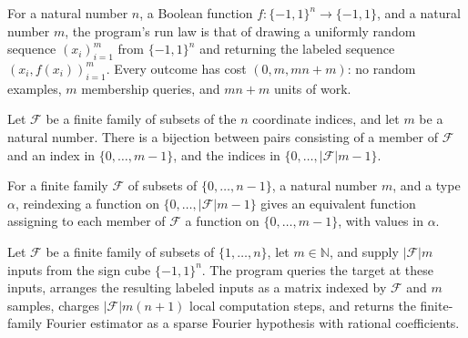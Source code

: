 \begin{theorem}
\label{FABL.runWithCost_queriedRandomExampleBatchProgram}
\leanok
{}
For a natural number $n$, a Boolean function $f:\{−1,1\}^n\to\{−1,1\}$, and a natural
number $m$, the program’s run law is that of drawing a uniformly random sequence
$(x_i)_{i=1}^m$ from $\{−1,1\}^n$ and returning the labeled sequence
$(x_i,f(x_i))_{i=1}^m$. Every outcome has cost $(0,m,mn+m)$: no random examples, $m$
membership queries, and $mn+m$ units of work.
\end{theorem}

\begin{definition}
\label{FABL.finiteFamilyMatrixIndexEquiv}
\leanok
Let $\mathcal F$ be a finite family of subsets of the $n$ coordinate indices, and let
$m$ be a natural number. There is a bijection between pairs consisting of a member of
$\mathcal F$ and an index in $\{0,\ldots,m-1\}$, and the indices in
$\{0,\ldots,|\mathcal F|m-1\}$.
\end{definition}

\begin{definition}
\label{FABL.finiteFamilyLinearToMatrixEquiv}
\leanok
{}
For a finite family $\mathcal F$ of subsets of $\{0,\ldots,n-1\}$, a natural number $m$,
and a type $\alpha$, reindexing a function on $\{0,\ldots,|\mathcal F|m-1\}$ gives an
equivalent function assigning to each member of $\mathcal F$ a function on
$\{0,\ldots,m-1\}$, with values in $\alpha$.
\end{definition}

\begin{definition}
\label{FABL.queriedFiniteFamilyFourierEstimatorFromInputs}
\leanok
{}
Let $\mathcal{F}$ be a finite family of subsets of $\{1,\ldots,n\}$, let
$m\in\mathbb{N}$, and supply $|\mathcal{F}|m$ inputs from the sign cube $\{-1,1\}^n$.
The program queries the target at these inputs, arranges the resulting labeled inputs as
a matrix indexed by $\mathcal{F}$ and $m$ samples, charges $|\mathcal{F}|m(n+1)$ local
computation steps, and returns the finite-family Fourier estimator as a sparse Fourier
hypothesis with rational coefficients.
\end{definition}

